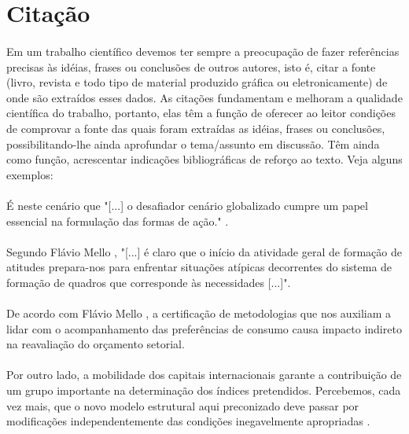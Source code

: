 \section{Citação}

\paragraph{}Em um trabalho científico devemos ter sempre a preocupação de fazer referências precisas às idéias, frases ou conclusões de outros autores, isto é, citar a fonte (livro, revista e todo tipo de material produzido gráfica ou eletronicamente) de onde são extraídos esses dados. As citações fundamentam e melhoram a qualidade científica do trabalho, portanto, elas têm a função de oferecer ao leitor condições de comprovar a fonte das quais foram extraídas as idéias, frases ou conclusões, possibilitando-lhe ainda aprofundar o tema/assunto em discussão. Têm ainda como função, acrescentar indicações bibliográficas de reforço ao texto. Veja alguns exemplos:

\paragraph{}É neste cenário que "[...] o desafiador cenário globalizado cumpre um papel essencial na formulação das formas de ação." \cite{Papadimitriou04}.

\paragraph{}Segundo Flávio Mello \cite{BrainVoyager06}, "[...] é claro que o início da atividade geral de formação de atitudes prepara-nos para enfrentar situações atípicas decorrentes do sistema de formação de quadros que corresponde às necessidades [...]".

\paragraph{}De acordo com Flávio Mello \cite{Heeger02}, a certificação de metodologias que nos auxiliam a lidar com o acompanhamento das preferências de consumo causa impacto indireto na reavaliação do orçamento setorial.

\paragraph{}Por outro lado, a mobilidade dos capitais internacionais garante a contribuição de um grupo importante na determinação dos índices pretendidos.  Percebemos, cada vez mais, que o novo modelo estrutural aqui preconizado deve passar por modificações independentemente das condições inegavelmente apropriadas \cite{Canguilhem80}.

